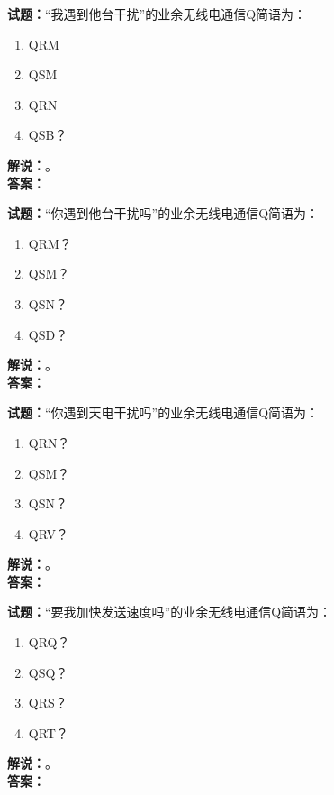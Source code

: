 \documentclass{ctexbook}
\begin{document}
\vspace{\baselineskip}

\noindent\textbf{试题：}“我遇到他台干扰”的业余无线电通信Q简语为：
\begin{enumerate}[leftmargin=3em]
  \item QRM
  \item QSM
  \item QRN
  \item QSB？
\end{enumerate}
\noindent\textbf{解说：}\textbf{}。\\\noindent\textbf{答案：}

\vspace{\baselineskip}

\noindent\textbf{试题：}“你遇到他台干扰吗”的业余无线电通信Q简语为：
\begin{enumerate}[leftmargin=3em]
  \item QRM？
  \item QSM？
  \item QSN？
  \item QSD？
\end{enumerate}
\noindent\textbf{解说：}\textbf{}。\\\noindent\textbf{答案：}

\vspace{\baselineskip}

\noindent\textbf{试题：}“你遇到天电干扰吗”的业余无线电通信Q简语为：
\begin{enumerate}[leftmargin=3em]
  \item QRN？
  \item QSM？
  \item QSN？
  \item QRV？
\end{enumerate}
\noindent\textbf{解说：}\textbf{}。\\\noindent\textbf{答案：}

\vspace{\baselineskip}

\noindent\textbf{试题：}“要我加快发送速度吗”的业余无线电通信Q简语为：
\begin{enumerate}[leftmargin=3em]
  \item QRQ？
  \item QSQ？
  \item QRS？
  \item QRT？
\end{enumerate}
\noindent\textbf{解说：}\textbf{}。\\\noindent\textbf{答案：}
\end{document}

